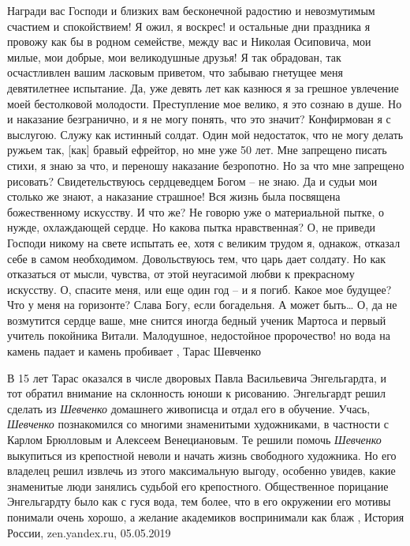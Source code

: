 Награди вас Господи и близких вам бесконечной радостию и невозмутимым счастием
и спокойствием! Я ожил, я воскрес! и остальные дни праздника я провожу как бы в
родном семействе, между вас и Николая Осиповича, мои милые, мои добрые, мои
великодушные друзья! Я так обрадован, так осчастливлен вашим ласковым приветом,
что забываю гнетущее меня девятилетнее испытание. Да, уже девять лет как
казнюся я за грешное увлечение моей бестолковой молодости. Преступление мое
велико, я это сознаю в душе. Но и наказание безгранично, и я не могу понять,
что это значит? Конфирмован я с выслугою. Служу как истинный солдат.  Один мой
недостаток, что не могу делать ружьем так, [как] бравый ефрейтор, но мне уже 50
лет.  Мне запрещено писать стихи, я знаю за что, и переношу наказание
безропотно. Но за что мне запрещено рисовать? Свидетельствуюсь сердцеведцем
Богом – не знаю.  Да и судьи мои столько же знают, а наказание страшное! Вся
жизнь была посвящена божественному искусству. И что же? Не говорю уже о
материальной пытке, о нужде, охлаждающей сердце. Но какова пытка нравственная?
О, не приведи Господи никому на свете испытать ее, хотя с великим трудом я,
однакож, отказал себе в самом необходимом. Довольствуюсь тем, что царь дает
солдату. Но как отказаться от мысли, чувства, от этой неугасимой любви к
прекрасному искусству. О, спасите меня, или еще один год – и я погиб. Какое мое
будущее? Что у меня на горизонте?  Слава Богу, если богадельня. А может быть…
О, да не возмутится сердце ваше, мне снится иногда бедный ученик Мартоса и
первый учитель покойника Витали.  Малодушное, недостойное пророчество! но вода
на камень падает и камень пробивает
, Тарас Шевченко

В 15 лет Тарас оказался в числе дворовых Павла Васильевича Энгельгардта, и тот
обратил внимание на склонность юноши к рисованию. Энгельгардт решил сделать из
\emph{Шевченко} домашнего живописца и отдал его в обучение.  Учась, \emph{Шевченко}
познакомился со многими знаменитыми художниками, в частности с Карлом Брюлловым
и Алексеем Венециановым. Те решили помочь \emph{Шевченко} выкупиться из крепостной
неволи и начать жизнь свободного художника. Но его владелец решил извлечь из
этого максимальную выгоду, особенно увидев, какие знаменитые люди занялись
судьбой его крепостного. Общественное порицание Энгельгардту было как с гуся
вода, тем более, что в его окружении его мотивы понимали очень хорошо, а
желание академиков воспринимали как блаж
, История России, zen.yandex.ru, 05.05.2019

